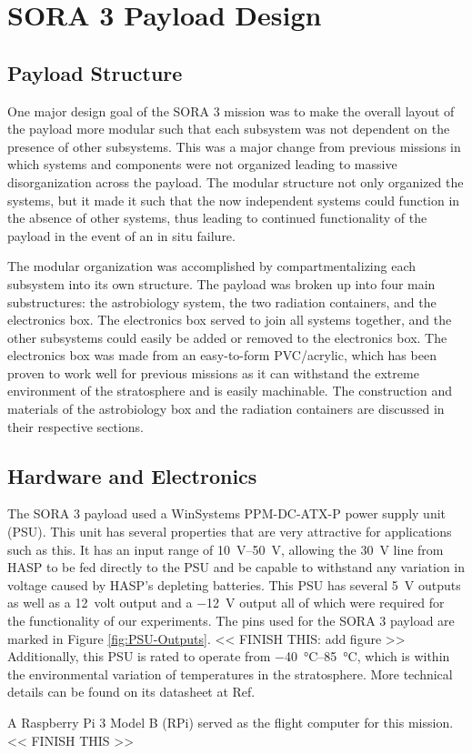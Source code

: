 \section{SORA 3 Payload Design}
\label{sec:Design}

\subsection{Payload Structure}
One major design goal of the SORA 3 mission was to make the overall layout of the payload more modular such that each subsystem was not dependent on the presence of other subsystems.
This was a major change from previous missions in which systems and components were not organized leading to massive disorganization across the payload.
The modular structure not only organized the systems, but it made it such that the now independent systems could function in the absence of other systems, thus leading to continued functionality of the payload in the event of an in situ failure.

The modular organization was accomplished by compartmentalizing each subsystem into its own structure.
The payload was broken up into four main substructures: the astrobiology system, the two radiation containers, and the electronics box.
The electronics box served to join all systems together, and the other subsystems could easily be added or removed to the electronics box.
The electronics box was made from an easy-to-form PVC/acrylic, which has been proven to work well for previous missions as it can withstand the extreme environment of the stratosphere and is easily machinable.
The construction and materials of the astrobiology box and the radiation containers are discussed in their respective sections.



\subsection{Hardware and Electronics}
The SORA 3 payload used a WinSystems PPM-DC-ATX-P power supply unit (PSU).
This unit has several properties that are very attractive for applications such as this. 
It has an input range of \SIrange{10}{50}{\volt}, allowing the \SI{30}{\volt} line from HASP to be fed directly to the PSU and be capable to withstand any variation in voltage caused by HASP's depleting batteries.
This PSU has several \SI{+5}{\volt} outputs as well as a \SI{+12}{volt} output and a \SI{-12}{\volt} output all of which were required for the functionality of our experiments.
The pins used for the SORA 3 payload are marked in Figure \ref{fig:PSU-Outputs}. << FINISH THIS: add figure >>
Additionally, this PSU is rated to operate from \SIrange{-40}{85}{\celsius}, which is within the environmental variation of temperatures in the stratosphere.
More technical details can be found on its datasheet at Ref. \cite{WinSystems-PSU}

A Raspberry Pi 3 Model B (RPi) served as the flight computer for this mission.
<< FINISH THIS >>
